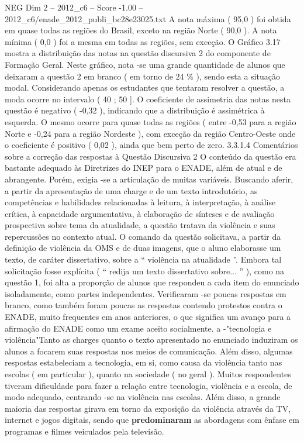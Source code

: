 \begin{textsample}{NEG Dim 2 – 2012\_c6 – Score -1.00 – 2012\_c6/enade\_2012\_publi\_bc28e23025.txt}
A nota máxima ( 95,0 ) foi obtida em quase todas as regiões do Brasil, exceto na região Norte ( 90,0 ).
A nota mínima ( 0,0 ) foi a mesma em todas as regiões, sem exceção.
O Gráfico 3.17 mostra a distribuição das notas na questão discursiva 2 do componente de Formação Geral.
Neste gráfico, nota -se uma grande quantidade de alunos que deixaram a questão 2 em branco ( em torno de 24 \% ), sendo esta a situação modal.
Considerando apenas os estudantes que tentaram resolver a questão, a moda ocorre no intervalo ( 40 ; 50 ].
O coeficiente de assimetria das notas nesta questão é negativo ( -0,32 ), indicando que a distribuição é assimétrica à esquerda.
O mesmo ocorre para quase todas as regiões ( entre -0,53 para a região Norte e -0,24 para a região Nordeste ), com exceção da região Centro-Oeste onde o coeficiente é positivo ( 0,02 ), ainda que bem perto de zero. 3.3.1.4 Comentários sobre a correção das respostas à Questão Discursiva 2 O conteúdo da questão era bastante adequado às Diretrizes do INEP para o ENADE, além de atual e de abrangente.
Porém, exigia -se a articulação de muitas variáveis.
Buscando aferir, a partir da apresentação de uma charge e de um texto introdutório, as competências e habilidades relacionadas à leitura, à interpretação, à análise crítica, à capacidade argumentativa, à elaboração de sínteses e de avaliação prospectiva sobre tema da atualidade, a questão tratava da violência e suas repercussões no contexto atual.
O comando da questão solicitava, a partir da definição de violência da OMS e de duas imagens, que o aluno elaborasse um texto, de caráter dissertativo, sobre a “ violência na atualidade ”.
Embora tal solicitação fosse explícita ( “ redija um texto dissertativo sobre... ” ), como na questão 1, foi alta a proporção de alunos que respondeu a cada item do enunciado isoladamente, como partes independentes.
Verificaram -se poucas respostas em branco, como também foram poucas as respostas contendo protestos contra o ENADE, muito frequentes em anos anteriores, o que significa um avanço para a afirmação do ENADE como um exame aceito socialmente. a -"tecnologia e violência"Tanto as charges quanto o texto apresentado no enunciado induziram os alunos a focarem suas respostas nos meios de comunicação.
Além disso, algumas respostas estabeleciam a tecnologia, em si, como causa da violência tanto nas escolas ( em particular ), quanto na sociedade ( no geral ).
Muitos respondentes tiveram dificuldade para fazer a relação entre tecnologia, violência e a escola, de modo adequado, centrando -se na violência nas escolas.
Além disso, a grande maioria das respostas girava em torno da exposição da violência através da TV, internet e jogos digitais, sendo que \textbf{predominaram} as abordagens com ênfase em programas e filmes veiculados pela televisão.

\end{textsample}
